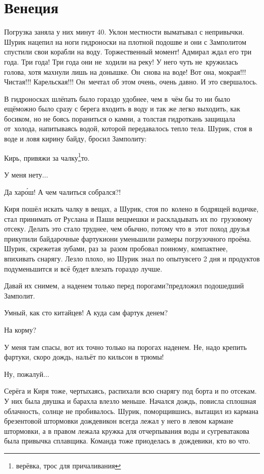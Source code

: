 \chapter{Венеция}
\vepsianrose

Погрузка заняла у них минут 40. Уклон местности выматывал с непривычки. Шурик нацепил на ноги гидроноски на плотной подошве и они с Замполитом спустили свои корабли на воду. Торжественный момент! Адмирал ждал его три года. Три года! Три года они не~ходили на реку! У него чуть не~кружилась голова, хотя махнули лишь на донышке. Он~снова на воде! Вот она, мокрая!!! Чистая!!! Карельская!!! Он~мечтал об этом очень, очень давно. И это свершалось.

В гидроносках шлёпать было гораздо удобнее, чем в~чём бы то ни было ещё\mdash можно было сразу с берега входить в воду и так же легко выходить, как босиком, но не боясь пораниться о камни, а толстая гидроткань защищала от~холода, напитываясь водой, которой передавалось тепло тела. Шурик, стоя в воде и ловя кирину байду, бросил Замполиту:

\mdash Кирь, привяжи за чалку\footnote{верёвка, трос для причаливания}\sdash то.

\mdash У меня нету$\ldots$

\mdash Да хар\'{о}ш! А чем чалиться собрался?!

Киря пошёл искать чалку в вещах, а Шурик, стоя по~колено в бодрящей водичке, стал принимать от Руслана и Паши вещмешки и раскладывать их по~грузовому отсеку. Делать это стало труднее, чем обычно, потому что в~этот поход друзья прикупили байдарочные фартуки\mdash они уменьшили размеры погрузочного проёма. Шурик, скрежетая зубами, раз за~разом пробовал по\sdash иному, компактнее, впихивать снарягу. Лезло плохо, но Шурик знал по опыту\mdash всего 2 дня и продуктов подуменьшится и всё будет влезать гораздо лучше.

\mdash Давай их снимем, а наденем только перед порогами?\mdash предложил подошедший Замполит. 

\mdash Умный, как сто китайцев! А куда сам фартук денем? 

\mdash На корму?

\mdash У меня там спасы, вот их точно только на порогах наденем. Не, надо крепить фартуки, скоро дождь, нальёт по кильсон в трюмы!

\mdash Ну, пожалуй$\ldots$

Серёга и Киря тоже, чертыхаясь, распихали всю снарягу под борта и по отсекам. У них была двушка и барахла влезло меньше. Начался дождь, повисла сплошная облачность, солнце не пробивалось. Шурик, поморщившись, вытащил из кармана брезентовой штормовки дождевик\mdash он всегда лежал у него в левом кармане штормовки, а в правом лежала кружка для отчерпывания воды и сугрева\mdash такова была привычка сплавщика. Команда тоже приоделась в~дождевики, кто во что.

